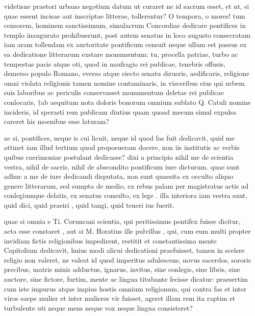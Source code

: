  videtisne praetori urbano negotium datum ut curaret ne id sacrum esset, et ut, si quae essent incisae aut inscriptae litterae, tollerentur? O tempora, o mores! tum censorem, hominem sanctissimum, simulacrum Concordiae dedicare pontifices in templo inaugurato prohibuerunt, post autem senatus in loco augusto consecratam iam aram tollendam ex auctoritate pontificum censuit neque ullum est passus ex ea dedicatione litterarum exstare monumentum: tu, procella patriae, turbo ac tempestas pacis atque oti, quod in naufragio rei publicae, tenebris offusis, demerso populo Romano, everso atque eiecto senatu dirueris, aedificaris, religione omni violata religionis tamen nomine contaminaris, in visceribus eius qui urbem suis laboribus ac periculis conservasset monumentum deletae rei publicae conlocaris, †ab aequitum nota doloris bonorum omnium sublato Q. Catuli nomine incideris, id sperasti rem publicam diutius quam quoad mecum simul expulsa careret his moenibus esse laturam?

 ac si, pontifices, neque is cui licuit, neque id quod fas fuit dedicavit, quid me attinet iam illud tertium quod proposueram docere, non iis institutis ac verbis quibus caerimoniae postulant dedicasse? dixi a principio nihil me de scientia vestra, nihil de sacris, nihil de abscondito pontificum iure dicturum. quae sunt adhuc a me de iure dedicandi disputata, non sunt quaesita ex occulto aliquo genere litterarum, sed sumpta de medio, ex rebus palam per magistratus actis ad conlegiumque delatis, ex senatus consulto, ex lege . illa interiora iam vestra sunt, quid dici, quid praeiri , quid tangi, quid teneri ius fuerit.

 quae si omnia e Ti. Coruncani scientia, qui peritissimus pontifex fuisse dicitur, acta esse constaret , aut si M. Horatius ille pulvillus , qui, cum eum multi propter invidiam fictis religionibus impedirent, restitit et constantissima mente Capitolium dedicavit, huius modi alicui dedicationi praefuisset, tamen in scelere religio non valeret, ne valeat id quod imperitus adulescens, novus sacerdos, sororis precibus, matris minis adductus, ignarus, invitus, sine conlegis, sine libris, sine auctore, sine fictore, furtim, mente ac lingua titubante fecisse dicatur: praesertim cum iste impurus atque impius hostis omnium religionum, qui contra fas et inter viros saepe mulier et inter mulieres vir fuisset, ageret illam rem ita raptim et turbulente uti neque mens neque vox neque lingua consisteret?

